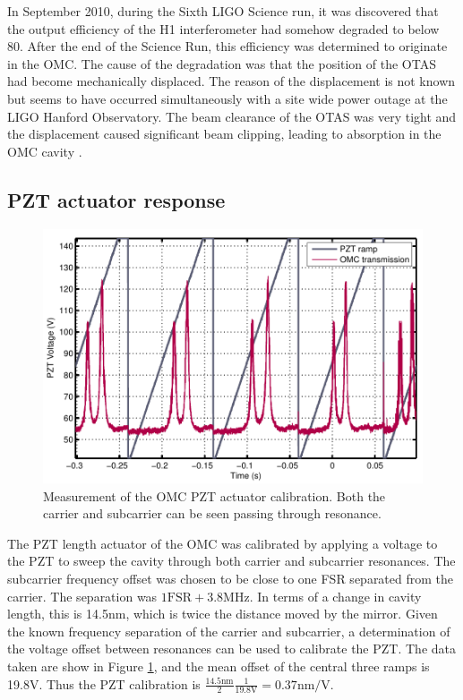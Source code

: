 In September 2010, during the Sixth LIGO Science run, it was discovered that the output efficiency of the H1 interferometer had somehow degraded to below 80\perc{}. %
After the end of the Science Run, this efficiency was determined to originate in the OMC. %
The cause of the degradation was that the position of the OTAS had become mechanically displaced. %
The reason of the displacement is not known but seems to have occurred simultaneously with a site wide power outage at the LIGO Hanford Observatory. %
The beam clearance of the OTAS was very tight and the displacement caused significant beam clipping, leading to absorption in the OMC cavity \cite{T1100562}.

\subsection{PZT actuator response}
\begin{figure}[h!]
  \begin{center}
  \leavevmode
  \includegraphics{figs-omc/pztdccal.pdf}
  \end{center}
  \caption[Measurement of the OMC PZT actuator calibration.]{Measurement of the OMC PZT actuator calibration. Both the carrier and subcarrier can be seen passing through resonance.}
  \label{fig:pztsweep}
\end{figure}
The PZT length actuator of the OMC was calibrated by applying a voltage to the PZT to sweep the cavity through both carrier and subcarrier resonances. %
The subcarrier frequency offset was chosen to be close to one FSR separated from the carrier. %
The separation was $1\mathrm{FSR}+3.8$MHz. %
In terms of a change in cavity length, this is 14.5nm, which is twice the distance moved by the mirror. %
Given the known frequency separation of the carrier and subcarrier, a determination of the voltage offset between resonances can be used to calibrate the PZT. %
The data taken are show in Figure \ref{fig:pztsweep}, and the mean offset of the central three ramps is 19.8V. %
Thus the PZT calibration is $\frac{14.5\text{nm}}{2}\frac{1}{19.8\text{V}}=0.37\text{nm}/\text{V}$.


